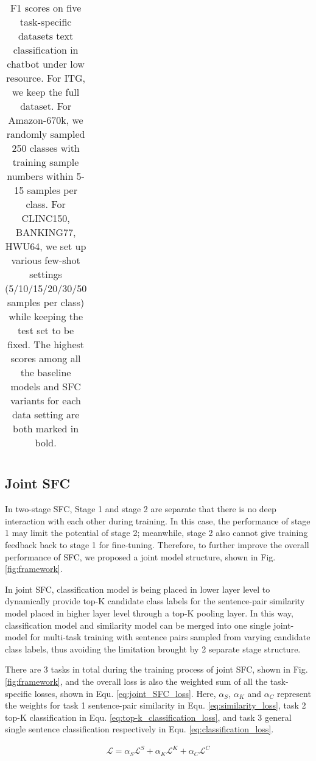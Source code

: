\begin{table*}
\begin{centering}
{\begin{tabular}{|c|cccccc|cccccc|cccccc|c|c|}
        & & & & & & & & & & & & & & & & & & & &\tabularnewline
        \hline
      \end{tabular}
    }
    \par
  \end{centering}
  \caption{
    F1 scores  on  five  task-specific  datasets text classification in chatbot
    under low resource. For ITG, we keep the full dataset. For Amazon-670k, we
    randomly  sampled  250  classes  with  training sample numbers within 5-15
    samples  per  class.  For  CLINC150,  BANKING77,  HWU64, we set up various
    few-shot  settings  (5/10/15/20/30/50 samples per class) while keeping the
    test  set to be fixed. The highest scores among all the baseline models and SFC variants for each data setting are both marked
    in bold.
  }
  \label{tbe:table2}
\end{table*}



\subsection{Joint SFC}
In  two-stage  SFC,  Stage  1  and  stage 2 are separate that there is no deep
interaction  with each other during training. In this case, the performance of
stage  1  may  limit  the potential of stage 2; meanwhile, stage 2 also cannot
give  training feedback back to stage 1 for fine-tuning. Therefore, to further
improve  the  overall performance of SFC, we proposed a joint model structure,
shown in Fig. \ref{fig:framework}.

In  joint  SFC,  classification  model is being placed in lower layer level to
dynamically  provide  top-K  candidate  class  labels  for  the  sentence-pair
similarity  model  placed in higher layer level through a top-K pooling layer.
In  this way, classification model and similarity model can be merged into one
single  joint-model  for  multi-task training with sentence pairs sampled from
varying  candidate  class  labels,  thus  avoiding the limitation brought by 2
separate stage structure.

There  are 3 tasks in total during the training process of joint SFC, shown in
Fig. \ref{fig:framework}, and the overall loss is also the weighted sum of all
the   task-specific  losses,  shown  in  Equ.  \ref{eq:joint_SFC_loss}.  Here,
$\alpha_S$,  $\alpha_K$  and  $\alpha_C$  represent  the  weights  for  task 1
sentence-pair  similarity  in  Equ.  \ref{eq:similarity_loss},  task  2  top-K
classification  in Equ. \ref{eq:top-k_classification_loss}, and task 3 general
single       sentence       classification      respectively      in      Equ.
\ref{eq:classification_loss}.

\begin{align}
  \mathcal{L} = \alpha_S \mathcal{L}^S + \alpha_K \mathcal{L}^K + \alpha_C \mathcal{L}^C
  \label{eq:joint_SFC_loss}
\end{align}


